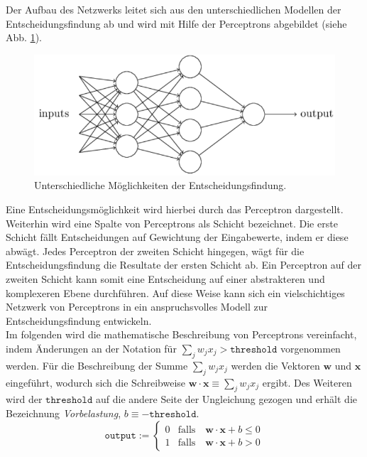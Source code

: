 \noindent
Der Aufbau des Netzwerks leitet sich aus den unterschiedlichen Modellen der Entscheidungsfindung ab und wird mit Hilfe der Perceptrons abgebildet (siehe Abb. \ref{fig:perceptron_models}).
\begin{figure}[hbt]
	\centering
	\includegraphics[scale=0.75]{Bilder/perceptron_models}
	\caption{Unterschiedliche Möglichkeiten der Entscheidungsfindung.} 
	\label{fig:perceptron_models} 
\end{figure}
Eine Entscheidungsmöglichkeit wird hierbei durch das Perceptron dargestellt. Weiterhin wird eine Spalte von Perceptrons als Schicht bezeichnet. Die erste Schicht fällt Entscheidungen auf Gewichtung der Eingabewerte, indem er diese abwägt. Jedes Perceptron der zweiten Schicht hingegen, wägt für die Entscheidungsfindung die Resultate der ersten Schicht ab. Ein Perceptron auf der zweiten Schicht kann somit eine Entscheidung auf einer abstrakteren und komplexeren Ebene durchführen. Auf diese Weise kann sich ein vielschichtiges Netzwerk von Perceptrons in ein anspruchsvolles Modell zur Entscheidungsfindung entwickeln. \\

\noindent
Im folgenden wird die mathematische Beschreibung von Perceptrons vereinfacht, indem Änderungen an der Notation für $\sum_j w_j x_j > \mathtt{threshold}$ vorgenommen werden. Für die Beschreibung der Summe $\sum_j w_j x_j$ werden die Vektoren $\mathbf{w}$ und $\mathbf{x}$ eingeführt, wodurch sich die Schreibweise $\mathbf{w} \cdot \mathbf{x} \equiv \sum_j w_j x_j$ ergibt. Des Weiteren wird der $\mathtt{threshold}$ auf die andere Seite der Ungleichung gezogen und erhält die Bezeichnung \textit{Vorbelastung}, $b \equiv \mathtt{-threshold}$. 
\begin{equation}
	\mathtt{output} := \left\{
	\begin{array}{ll}
 		0 & \displaystyle \mbox{falls}\quad \mathbf{w} \cdot \mathbf{x} + b \leq 0 \\[0.2cm]
 		1 & \displaystyle \mbox{falls}\quad \mathbf{w} \cdot \mathbf{x} + b > 0
	\end{array}\right.
\end{equation}

